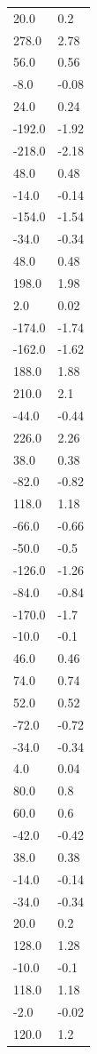 \begin{longtable}{ll}
20.0 & 0.2 \\
278.0 & 2.78 \\
56.0 & 0.56 \\
-8.0 & -0.08 \\
24.0 & 0.24 \\
-192.0 & -1.92 \\
-218.0 & -2.18 \\
48.0 & 0.48 \\
-14.0 & -0.14 \\
-154.0 & -1.54 \\
-34.0 & -0.34 \\
48.0 & 0.48 \\
198.0 & 1.98 \\
2.0 & 0.02 \\
-174.0 & -1.74 \\
-162.0 & -1.62 \\
188.0 & 1.88 \\
210.0 & 2.1 \\
-44.0 & -0.44 \\
226.0 & 2.26 \\
38.0 & 0.38 \\
-82.0 & -0.82 \\
118.0 & 1.18 \\
-66.0 & -0.66 \\
-50.0 & -0.5 \\
-126.0 & -1.26 \\
-84.0 & -0.84 \\
-170.0 & -1.7 \\
-10.0 & -0.1 \\
46.0 & 0.46 \\
74.0 & 0.74 \\
52.0 & 0.52 \\
-72.0 & -0.72 \\
-34.0 & -0.34 \\
4.0 & 0.04 \\
80.0 & 0.8 \\
60.0 & 0.6 \\
-42.0 & -0.42 \\
38.0 & 0.38 \\
-14.0 & -0.14 \\
-34.0 & -0.34 \\
20.0 & 0.2 \\
128.0 & 1.28 \\
-10.0 & -0.1 \\
118.0 & 1.18 \\
-2.0 & -0.02 \\
120.0 & 1.2 \\

\end{longtable}
